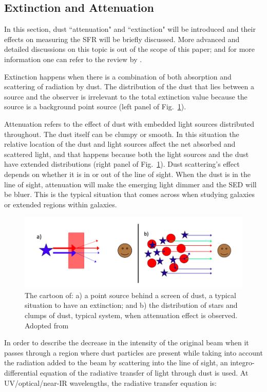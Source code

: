 \subsection{Extinction and Attenuation}
\label{sec: ism}
In this section, dust ``attenuation" and ``extinction" will be introduced and their effects on measuring the SFR will be briefly discussed. More advanced and detailed discussions on this topic is out of the scope of this paper; and for more information one can refer to the review by \citep{Calzetti01}. 

Extinction happens when there is a combination of both absorption and scattering of radiation by dust. The distribution of the dust that lies between a source and the observer is irrelevant to the total extinction value because the source is a background point source (left panel of Fig.{~\ref{fig:duste}}).

Attenuation refers to the effect of dust with embedded light sources distributed throughout. The dust itself can be clumpy or smooth\citep{Calzetti13}. In this situation the relative location of the dust and light sources affect the net absorbed and scattered light, and that happens because both the light sources and the dust have extended distributions (right panel of Fig.{~\ref{fig:duste}}). Dust scattering's effect depends on whether it is in or out of the line of sight. When the dust is in the line of sight, attenuation will make the emerging light dimmer and the SED will be bluer. This is the typical situation that comes across when studying galaxies or extended regions within galaxies.

\begin{figure}[h]
\label{fig:duste}
\centering
\includegraphics[width=16cm]{../image_intro/dustextinction}
\caption{The cartoon of: a) a point source behind a screen of dust, a typical situation to have an extinction; and b) the distribution of stars and clumps of dust, typical system, when attenuation effect is observed. Adopted from \cite{Calzetti13}}
\end{figure}

In order to describe the decrease in the intensity of the original beam when it passes through a region where dust particles are present while taking into account the radiation added to the beam by scattering into the line of sight, an integro-differential equation of the radiative transfer of light through dust is used. At UV/optical/near-IR wavelengths, the radiative transfer equation is:

